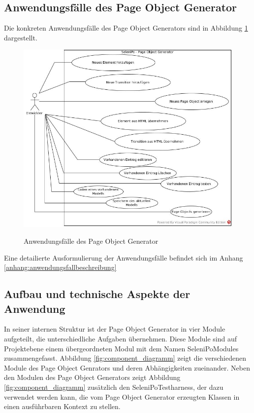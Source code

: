 \subsection{Anwendungsfälle des Page Object Generator}
\label{sec:page_object_generator_usecases}

Die konkreten Anwendungsfälle des Page Object Generators sind in Abbildung \ref{fig:use_case} dargestellt.

\begin{figure}[htb]
  \centering  
  \includegraphics[scale=0.45]{img/Use-Cases.jpg}\\
  \caption{Anwendungsfälle des Page Object Generator}
  \label{fig:use_case}
\end{figure}

Eine detailierte Ausformulierung der Anwendungsfälle befindet sich im Anhang \ref{anhang:anwendungsfallbeschreibung}

\newpage

\subsection{Aufbau und technische Aspekte der Anwendung}
\label{sec:aufbau_des_systems}
In seiner internen Struktur ist der Page Object Generator in vier Module aufgeteilt, die unterschiedliche Aufgaben übernehmen. Diese Module sind auf Projektebene einem übergeordneten Modul mit dem Namen SeleniPoModules zusammengefasst. Abbildung \ref{fig:component_diagramm} zeigt die verschiedenen Module des Page Object Genrators und deren Abhängigkeiten zueinander.
Neben den Modulen des Page Object Generators zeigt Abbildung \ref{fig:component_diagramm} zusätzlich den SeleniPoTestharness, der dazu verwendet werden kann, die vom Page Object Generator erzeugten Klassen in einen ausführbaren Kontext zu stellen.

